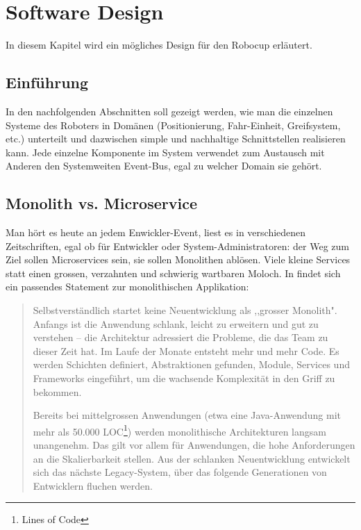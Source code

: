 \chapter{Software Design}
\label{chap:software-design}
In diesem Kapitel wird ein mögliches Design für den Robocup erläutert.
\section{Einführung}
In den nachfolgenden Abschnitten soll gezeigt werden, wie man die einzelnen Systeme des Roboters in Domänen (Positionierung, Fahr-Einheit, Greifsystem, etc.) unterteilt und dazwischen simple und nachhaltige Schnittstellen realisieren kann.
Jede einzelne Komponente im System verwendet zum Austausch mit Anderen den Systemweiten Event-Bus, egal zu welcher Domain sie gehört.

\section{Monolith vs. Microservice}
Man hört es heute an jedem Enwickler-Event, liest es in verschiedenen Zeitschriften, egal ob für Entwickler oder System-Administratoren: der Weg zum Ziel sollen Microservices sein, sie sollen Monolithen ablösen. Viele kleine Services statt einen grossen, verzahnten und schwierig wartbaren Moloch. 
In \cite{informatik-aktuell-microservices} findet sich ein passendes Statement zur monolithischen Applikation:
\begin{quote}
	Selbstverständlich startet keine Neuentwicklung als ,,grosser Monolith". Anfangs ist die Anwendung schlank, leicht zu erweitern und gut zu verstehen – die Architektur adressiert die Probleme, die das Team zu dieser Zeit hat. Im Laufe der Monate entsteht mehr und mehr Code. Es werden Schichten definiert, Abstraktionen gefunden, Module, Services und Frameworks eingeführt, um die wachsende Komplexität in den Griff zu bekommen.
	
	Bereits bei mittelgrossen Anwendungen (etwa eine Java-Anwendung mit mehr als 50.000 LOC\footnote{Lines of Code}) werden monolithische Architekturen langsam unangenehm. Das gilt vor allem für Anwendungen, die hohe Anforderungen an die Skalierbarkeit stellen. Aus der schlanken Neuentwicklung entwickelt sich das nächste Legacy-System, über das folgende Generationen von Entwicklern fluchen werden.
\end{quote}
